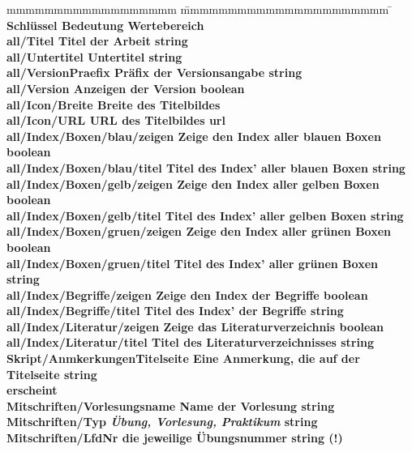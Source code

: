 			\begin{tabbing}
				mmmmmmmmmmmmmmmmmm				\= mmmmmmmmmmmmmmmmmmmmmm 				\=\kill
				\bf Schlüssel					\> \bf Bedeutung 						\> \bf Wertebereich	\\
				all/Titel	 					\> Titel der Arbeit						\> string			\\
				all/Untertitel 					\> Untertitel							\> string			\\
				all/VersionPraefix 				\> Präfix der Versionsangabe			\> string			\\
				all/Version 					\> Anzeigen der Version					\> boolean 			\\
				all/Icon/Breite					\> Breite des Titelbildes				\> \doubleplus 		\\
				all/Icon/URL					\> URL des Titelbildes					\> url				\\
				all/Index/Boxen/blau/zeigen 	\> Zeige den Index aller blauen Boxen	\> boolean 			\\
				all/Index/Boxen/blau/titel 		\> Titel des Index' aller blauen Boxen	\> string			\\
				all/Index/Boxen/gelb/zeigen 	\> Zeige den Index aller gelben Boxen	\> boolean 			\\
				all/Index/Boxen/gelb/titel 		\> Titel des Index' aller gelben Boxen	\> string			\\
				all/Index/Boxen/gruen/zeigen 	\> Zeige den Index aller grünen Boxen	\> boolean 			\\
				all/Index/Boxen/gruen/titel 	\> Titel des Index' aller grünen Boxen	\> string			\\
				all/Index/Begriffe/zeigen 		\> Zeige den Index der Begriffe			\> boolean			\\
				all/Index/Begriffe/titel 		\> Titel des Index' der Begriffe		\> string			\\
				all/Index/Literatur/zeigen		\> Zeige das Literaturverzeichnis		\> boolean			\\
				all/Index/Literatur/titel		\> Titel des Literaturverzeichnisses	\> string			\\
				Skript/AnmkerkungenTitelseite 	\> Eine Anmerkung, die auf der Titelseite\> string			\\ 
												\> erscheint												\\
				Mitschriften/Vorlesungsname 	\> Name der Vorlesung 					\> string			\\
				Mitschriften/Typ 				\> \zb \emph{Übung, Vorlesung, Praktikum}	
																						\> string			\\
				Mitschriften/LfdNr 				\> \zb die jeweilige Übungsnummer		\> string (!)		\\

\end{tabbing}
